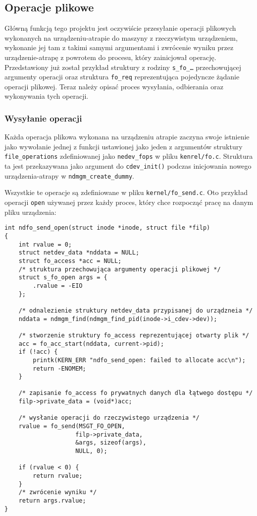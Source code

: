 \documentclass[10pt]{scrartcl}
\begin{document}
\subsection{Operacje plikowe}
\label{foops}

Główną funkcją tego projektu jest oczywiście przesyłanie operacji plikowych wykonanych na urządzeniu-atrapie do maszyny z rzeczywistym urządzeniem, wykonanie jej tam z takimi samymi argumentami i zwrócenie wyniku przez urządzenie-atrapę z powrotem do procesu, który zainicjował operację. Przedstawiony już został przykład struktury z rodziny \texttt{s\_fo\_\ldots} przechowującej argumenty operacji oraz struktura \texttt{fo\_req} reprezentująca pojedyncze żądanie operacji plikowej.  Teraz należy opisać proces wysyłania, odbierania oraz wykonywania tych operacji.

\subsubsection{Wysyłanie operacji}
\label{fosend}

Każda operacja plikowa wykonana na urządzeniu atrapie zaczyna swoje istnienie jako wywołanie jednej z funkcji ustawionej jako jeden z argumentów struktury \texttt{file\_operations} zdefiniowanej jako \texttt{nedev\_fops} w pliku \texttt{kenrel/fo.c}. Struktura ta jest przekazywana jako argument do \texttt{cdev\_init()} podczas inicjowania nowego urządzenia-atrapy w \texttt{ndmgm\_create\_dummy}.

Wszystkie te operacje są zdefiniowane w pliku \texttt{kernel/fo\_send.c}. Oto przykład operacji \texttt{open} używanej przez każdy proces, który chce rozpocząć pracę na danym pliku urządzenia:

\begin{verbatim}
int ndfo_send_open(struct inode *inode, struct file *filp)
{
    int rvalue = 0;
    struct netdev_data *nddata = NULL;
    struct fo_access *acc = NULL;
    /* struktura przechowująca argumenty operacji plikowej */
    struct s_fo_open args = {
        .rvalue = -EIO
    };

    /* odnalezienie struktury netdev_data przypisanej do urządzneia */
    nddata = ndmgm_find(ndmgm_find_pid(inode->i_cdev->dev));

    /* stworzenie struktury fo_access reprezentującej otwarty plik */
    acc = fo_acc_start(nddata, current->pid);
    if (!acc) {
        printk(KERN_ERR "ndfo_send_open: failed to allocate acc\n");
        return -ENOMEM;
    }

    /* zapisanie fo_access fo prywatnych danych dla łątwego dostępu */
    filp->private_data = (void*)acc;

    /* wysłanie operacji do rzeczywistego urządzenia */
    rvalue = fo_send(MSGT_FO_OPEN,
                    filp->private_data,
                    &args, sizeof(args),
                    NULL, 0);

    if (rvalue < 0) {
        return rvalue;
    }
    /* zwrócenie wyniku */
    return args.rvalue;
}
\end{verbatim}
\end{document}
